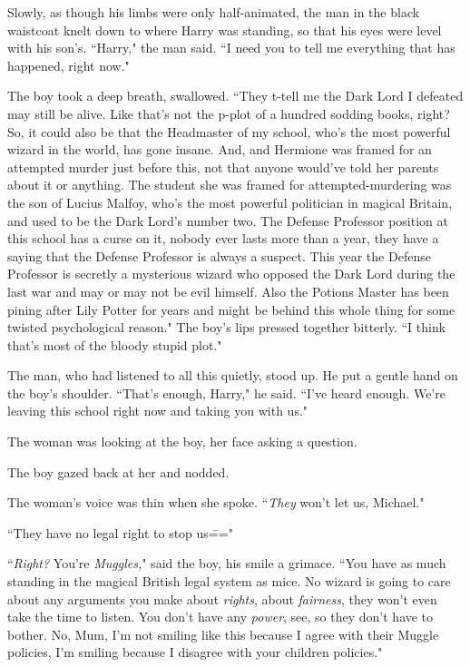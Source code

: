 Slowly, as though his limbs were only half-animated, the man in the black waistcoat knelt down to where Harry was standing, so that his eyes were level with his son's. ``Harry," the man said. ``I need you to tell me everything that has happened, right now."

The boy took a deep breath, swallowed. ``They t-tell me the Dark Lord I defeated may still be alive. Like that's not the p-plot of a hundred sodding books, right? So, it could also be that the Headmaster of my school, who's the most powerful wizard in the world, has gone insane. And, and Hermione was framed for an attempted murder just before this, not that anyone would've told her parents about it or anything. The student she was framed for attempted-murdering was the son of Lucius Malfoy, who's the most powerful politician in magical Britain, and used to be the Dark Lord's number two. The Defense Professor position at this school has a curse on it, nobody ever lasts more than a year, they have a saying that the Defense Professor is always a suspect. This year the Defense Professor is secretly a mysterious wizard who opposed the Dark Lord during the last war and may or may not be evil himself. Also the Potions Master has been pining after Lily Potter for years and might be behind this whole thing for some twisted psychological reason." The boy's lips pressed together bitterly. ``I think that's most of the bloody stupid plot."

The man, who had listened to all this quietly, stood up. He put a gentle hand on the boy's shoulder. ``That's enough, Harry," he said. ``I've heard enough. We're leaving this school right now and taking you with us."

The woman was looking at the boy, her face asking a question.

The boy gazed back at her and nodded.

The woman's voice was thin when she spoke. ``\emph{They} won't let us, Michael."

``They have no legal right to stop us\==="

``\emph{Right?} You're \emph{Muggles,}" said the boy, his smile a grimace. ``You have as much standing in the magical British legal system as mice. No wizard is going to care about any arguments you make about \emph{rights}, about \emph{fairness}, they won't even take the time to listen. You don't have any \emph{power}, see, so they don't have to bother. No, Mum, I'm not smiling like this because I agree with their Muggle policies, I'm smiling because I disagree with your children policies."

